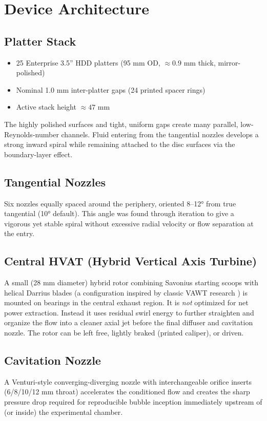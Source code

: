 \documentclass[11pt,a4paper]{article}
\begin{document}
\section{Device Architecture}

\subsection{Platter Stack}
\begin{itemize}
    \item 25 Enterprise 3.5'' HDD platters (95 mm OD, $\approx 0.9$ mm thick, mirror-polished)
    \item Nominal 1.0 mm inter-platter gaps (24 printed spacer rings)
    \item Active stack height $\approx 47$ mm
\end{itemize}

The highly polished surfaces and tight, uniform gaps create many parallel, low-Reynolds-number channels. Fluid entering from the tangential nozzles develops a strong inward spiral while remaining attached to the disc surfaces via the boundary-layer effect.

\subsection{Tangential Nozzles}
Six nozzles equally spaced around the periphery, oriented 8--12° from true tangential (10° default). This angle was found through iteration to give a vigorous yet stable spiral without excessive radial velocity or flow separation at the entry.

\subsection{Central HVAT (Hybrid Vertical Axis Turbine)}
A small (28 mm diameter) hybrid rotor combining Savonius starting scoops with helical Darrius blades (a configuration inspired by classic VAWT research \cite{savonius1925,darrieus1931,akwa2012,paraschivoiu2002,liang2017}) is mounted on bearings in the central exhaust region. It is \emph{not} optimized for net power extraction. Instead it uses residual swirl energy to further straighten and organize the flow into a cleaner axial jet before the final diffuser and cavitation nozzle. The rotor can be left free, lightly braked (printed caliper), or driven.

\subsection{Cavitation Nozzle}
A Venturi-style converging-diverging nozzle with interchangeable orifice inserts (6/8/10/12 mm throat) accelerates the conditioned flow and creates the sharp pressure drop required for reproducible bubble inception immediately upstream of (or inside) the experimental chamber.
\end{document}

